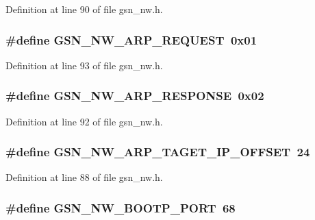 Definition at line 90 of file gsn\_\-nw.h.

\hypertarget{a00532_a7b44cb1dd0d6ce46cea9ef963a33140b}{
\subsubsection[{GSN\_\-NW\_\-ARP\_\-REQUEST}]{\setlength{\rightskip}{0pt plus 5cm}\#define GSN\_\-NW\_\-ARP\_\-REQUEST~0x01}}
\label{a00532_a7b44cb1dd0d6ce46cea9ef963a33140b}


Definition at line 93 of file gsn\_\-nw.h.

\hypertarget{a00532_a9e91355342fa43502e204bfbfb645f79}{
\subsubsection[{GSN\_\-NW\_\-ARP\_\-RESPONSE}]{\setlength{\rightskip}{0pt plus 5cm}\#define GSN\_\-NW\_\-ARP\_\-RESPONSE~0x02}}
\label{a00532_a9e91355342fa43502e204bfbfb645f79}


Definition at line 92 of file gsn\_\-nw.h.

\hypertarget{a00532_ad16a74995519cf1e9a0582465b6940fd}{
\subsubsection[{GSN\_\-NW\_\-ARP\_\-TAGET\_\-IP\_\-OFFSET}]{\setlength{\rightskip}{0pt plus 5cm}\#define GSN\_\-NW\_\-ARP\_\-TAGET\_\-IP\_\-OFFSET~24}}
\label{a00532_ad16a74995519cf1e9a0582465b6940fd}


Definition at line 88 of file gsn\_\-nw.h.

\hypertarget{a00532_a4d69f6d33a61ac5637e874ff68bfa566}{
\subsubsection[{GSN\_\-NW\_\-BOOTP\_\-PORT}]{\setlength{\rightskip}{0pt plus 5cm}\#define GSN\_\-NW\_\-BOOTP\_\-PORT~68}}
\label{a00532_a4d69f6d33a61ac5637e874ff68bfa566}


